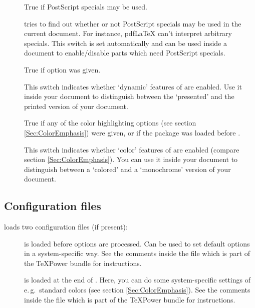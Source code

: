 \begin{description}
\item[] True if PostScript\textsuperscript{\textregistered} specials may be
  used.
  
   tries to find out whether or not PostScript\textsuperscript{\textregistered} specials may be used in
  the current document. For instance, pdf\LaTeX{} can't interpret arbitrary specials. This switch is set automatically
  and can be used inside a document to enable/disable parts which need PostScript\textsuperscript{\textregistered}
  specials.

\newslide

\item[] True if  option was given.

  This switch indicates whether `dynamic' features of  are enabled. Use it inside your document
  to distinguish between the `presented' and the printed version of your document.
  
\item[] True if any of the color highlighting options (see section
  \ref{Sec:ColorEmphasis}) were given, or if the  package was loaded before .
  
  This switch indicates whether `color' features of  are enabled (compare section
  \ref{Sec:ColorEmphasis}). You can use it inside your document to distinguish between a `colored' and a `monochrome'
  version of your document.
\end{description}

\newslide

\subsection{Configuration files}\label{Sec:Config}
 loads two configuration files (if present):
\begin{description}
\item[] is loaded before options are processed. Can be used to set default options
  in a system-specific way. See the comments inside the file  which is part of the \TeX Power bundle
  for instructions.
  
\item[] is loaded at the end of . Here, you can do some
  system-specific settings of e.\,g.\ standard colors (see section \ref{Sec:ColorEmphasis}). See the comments inside the
  file  which is part of the \TeX Power bundle for instructions.
\end{description}

